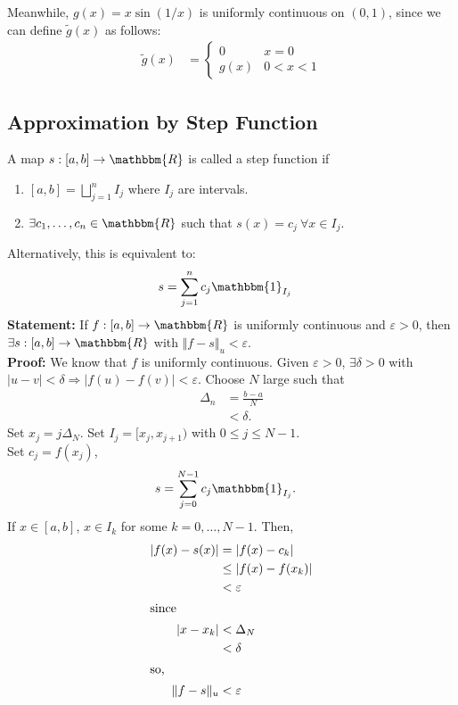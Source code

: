 \documentclass[10pt]{extarticle}
\newcommand{\R}{\mathbbm{R}}
\begin{document}
    Meanwhile, $g(x) = x\sin(1/x)$ is uniformly continuous on $(0,1)$, since we can define $\tilde{g}(x)$ as follows:
    \begin{align*}
      \tilde{g}(x) &= \begin{cases}
        0 & x=0\\
        g(x) & 0 < x < 1
      \end{cases}
    \end{align*}
  \subsection{Approximation by Step Function}%
    A map $s: [a,b] \rightarrow \R$ is called a step function if
    \begin{enumerate}[(1)]
      \item $\displaystyle [a,b] = \bigsqcup_{j=1}^{n} I_j$ where $I_j$ are intervals.
      \item $\displaystyle \exists c_1,\dots,c_n\in\R$ such that $s(x) = c_j~\forall x\in I_j$.
    \end{enumerate}
    Alternatively, this is equivalent to:
    \begin{align*}
      s &= \sum_{j=1}^{n}c_j\mathbbm{1}_{I_j}
    \end{align*}
    \textbf{Statement:} If $f: [a,b]\rightarrow \R$ is uniformly continuous and $\varepsilon > 0$, then $\exists s: [a,b]\rightarrow \R$ with $\Vert f - s\Vert_u < \varepsilon$.\\

    \textbf{Proof:} We know that $f$ is uniformly continuous. Given $\varepsilon > 0$, $\exists \delta > 0$ with $|u-v| < \delta \Rightarrow |f(u) - f(v)| < \varepsilon$. Choose $N$ large such that
    \begin{align*}
      \Delta_{n} &= \frac{b-a}{N}\\
                 &< \delta.
    \end{align*}
    Set $x_j = j\Delta_{N}$. Set $I_j = [x_j,x_{j+1})$ with $0 \leq j \leq N-1$.\\

    Set $c_j = f(x_j)$,
    \begin{align*}
      s &= \sum_{j=0}^{N-1}c_j\mathbbm{1}_{I_j}.
    \end{align*}
    If $x\in [a,b]$, $x\in I_k$ for some $k = 0,\dots,N-1$. Then,
    \begin{align*}
      |f(x) - s(x)| &= |f(x) - c_k|\\
                    &\leq |f(x) - f(x_k)|\\
                    &< \varepsilon\\
                    \shortintertext{since}
      |x-x_k| &< \Delta_N\\
              &< \delta\\
              \shortintertext{so,}
      \Vert f - s\Vert_u &< \varepsilon
    \end{align*}
\end{document}

